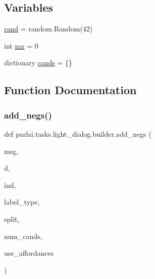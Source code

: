 \subsection*{Variables}
\begin{DoxyCompactItemize}
\item 
\hyperlink{namespaceparlai_1_1tasks_1_1light__dialog_1_1builder_a1a5f7c29e2ac62fb237eef07ae9815c1}{rand} = random.\+Random(42)
\item 
int \hyperlink{namespaceparlai_1_1tasks_1_1light__dialog_1_1builder_a3f89be6fdf88112fe7c566d593b3932c}{mx} = 0
\item 
dictionary \hyperlink{namespaceparlai_1_1tasks_1_1light__dialog_1_1builder_aaa9fd3ac19ed33a3e37093ffe025bbc0}{cands} = \{\}
\end{DoxyCompactItemize}


\subsection{Function Documentation}
\mbox{\label{namespaceparlai_1_1tasks_1_1light__dialog_1_1builder_a2f5cb4927740a90c9fba84df5e8e16b5}} 
\subsubsection{\texorpdfstring{add\+\_\+negs()}{add\_negs()}}
{\footnotesize\ttfamily def parlai.\+tasks.\+light\+\_\+dialog.\+builder.\+add\+\_\+negs (\begin{DoxyParamCaption}\item[{}]{msg,  }\item[{}]{d,  }\item[{}]{ind,  }\item[{}]{label\+\_\+type,  }\item[{}]{split,  }\item[{}]{num\+\_\+cands,  }\item[{}]{use\+\_\+affordances }\end{DoxyParamCaption})}

\mbox{\label{namespaceparlai_1_1tasks_1_1light__dialog_1_1builder_a6a049254e487c29d008f875476ffd76f}} 
